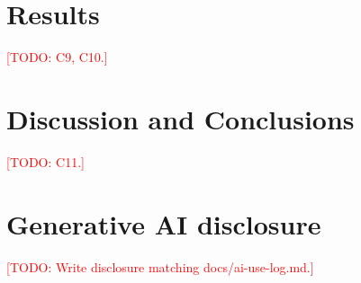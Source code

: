 \documentclass{article}
\newcommand{\todo}[1]{\textcolor{red}{[TODO: #1]}}
\begin{document}
\section{Results}
\todo{C9, C10.}

\section{Discussion and Conclusions}
\todo{C11.}

\section*{Generative AI disclosure}
\todo{Write disclosure matching docs/ai-use-log.md.}



\end{document}
